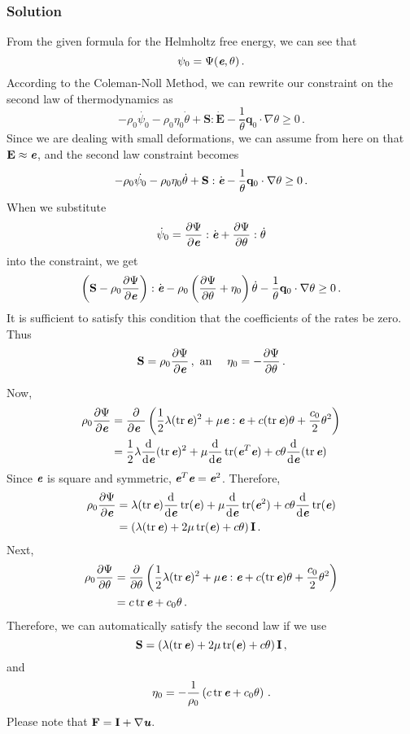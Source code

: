 \documentclass[letterpaper,10pt]{article}
\DeclareMathOperator*{\tr}{tr}
\def\mathbi#1{\textbf{\em #1}}
\def\d{\mathrm{d}}
\begin{document}
\subsubsection*{Solution}
From the given formula for the Helmholtz free energy, we can see that
\[
\psi_0=\Psi(\mathbi{e},\theta)\,.
\]
According to the Coleman-Noll Method, we can rewrite our constraint on the
second law of thermodynamics as
\[
-\rho_0\dot{\psi_0}-\rho_0\eta_0\dot\theta+\mathbf{S}:\dot{\mathbf{E}}-\frac{1}{
\theta}\mathbf{q}_0\cdot\nabla\theta\geq0\,.
\]
Since we are dealing with small deformations, we can assume from here on that
$\mathbf{E}\approx\mathbi{e}$, and the second law constraint becomes
\[
-\rho_0\dot{\psi_0}-\rho_0\eta_0\dot\theta+\mathbf{S}:\dot{\mathbi{e}}-\frac{1}{
\theta}\mathbf{q}_0\cdot\nabla\theta\geq0\,.
\]
When we substitute
\[
\dot\psi_0=\frac{\partial\Psi}{\partial\mathbi{e}}:\dot{\mathbi{e}}+
\frac{\partial\Psi}{\partial\theta}:\dot{\theta}
\]
into the constraint, we get
\[
\left(\mathbf{S}-\rho_0\frac{\partial\Psi}{\partial\mathbi{e}}\right):\dot{
\mathbi{e}}
-\rho_0\left(\frac{\partial\Psi}{\partial\theta}+\eta_0\right)\dot\theta
-\frac{1}{\theta}\mathbf{q}_0\cdot\nabla\theta\geq0\,.
\]
It is sufficient to satisfy this condition that the coefficients of the rates
be zero. Thus
\[
\mathbf{S}=\rho_0\frac{\partial\Psi}{\partial\mathbi{e}}\,,
\text{ an }\quad\eta_0=-\frac{ \partial\Psi}{\partial\theta}\,.
\]

Now,
\begin{align*}
\rho_0\frac{\partial\Psi}{\partial\mathbi{e}}&=\frac{\partial}{\partial\mathbi{e
} } \left(
\frac{1}{2}\lambda(\tr\mathbi{e})^2+\mu\mathbi{e}:\mathbi{e}
+c(\tr\mathbi{e})\theta+\frac{c_0}{2}\theta^2 \right)\\
&=\frac{1}{2}\lambda\frac{\d}{\d\mathbi{e}}(\tr\mathbi{e})^2
+\mu\frac{\d}{\d\mathbi{e}}\tr(\mathbi{e}^T\mathbi{e})
+c\theta\frac{\d}{\d\mathbi{e}}(\tr\mathbi{e})
\end{align*}
Since $\mathbi{e}$ is square and symmetric,
$\mathbi{e}^T\mathbi{e}=\mathbi{e}^2$.
Therefore,
\begin{align*}
\rho_0\frac{\partial\Psi}{\partial\mathbi{e}}
&=\lambda(\tr\mathbi{e})\frac{\d}{\d\mathbi{e}}\tr(\mathbi{e})
+\mu\frac{\d}{\d\mathbi{e}}\tr(\mathbi{e}^2)
+c\theta\frac{\d}{\d\mathbi{e}}\tr(\mathbi{e})\\
&=\left(\lambda(\tr\mathbi{e})
+2\mu\tr(\mathbi{e})
+c\theta\right)\mathbf{I}\,.
\end{align*}
Next,
\begin{align*}
\rho_0\frac{\partial\Psi}{\partial\theta}&=\frac{\partial}{\partial\theta}\left(
\frac{1}{2}\lambda(\tr\mathbi{e})^2+\mu\mathbi{e}:\mathbi{e}
+c(\tr\mathbi{e})\theta+\frac{c_0}{2}\theta^2 \right)\\
&=c\tr\mathbi{e}+c_0\theta\,.
\end{align*}
Therefore, we can automatically satisfy the second law if we use
\[
\mathbf{S}=\left(\lambda(\tr\mathbi{e})
+2\mu\tr(\mathbi{e})
+c\theta\right)\mathbf{I}\,,
\]
and
\[
\eta_0=-\frac{1}{\rho_0}\left(c\tr\mathbi{e}+c_0\theta\right)\,.
\]
Please note that $\mathbf{F}=\mathbf{I}+\nabla\mathbi{u}$.
\end{document}
